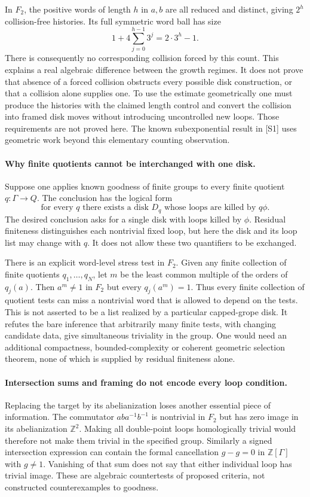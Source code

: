 \documentclass[11pt]{article}
\begin{document}
In $F_2$, the positive words of length $h$ in $a,b$ are all reduced
and distinct, giving $2^h$ collision-free histories. Its full symmetric
word ball has size
\[
                      1+4\sum_{j=0}^{h-1}3^j=2\cdot3^h-1.
\]
There is consequently no corresponding collision forced by this count.
This explains a real algebraic difference between the growth regimes.
It does not prove that absence of a forced collision obstructs every
possible disk construction, or that a collision alone supplies one.
To use the estimate geometrically one must produce the histories with
the claimed length control and convert the collision into framed disk
moves without introducing uncontrolled new loops. Those requirements
are not proved here. The known subexponential result in [S1] uses
geometric work beyond this elementary counting observation.

\paragraph{Why finite quotients cannot be interchanged with one disk.}
Suppose one applies known goodness of finite groups to every finite
quotient $q:\Gamma\to Q$. The conclusion has the logical form
\[
          \text{for every }q\text{ there exists a disk }D_q
          \text{ whose loops are killed by }q\phi.
\]
The desired conclusion asks for a single disk with loops killed by
$\phi$. Residual finiteness distinguishes each nontrivial fixed loop,
but here the disk and its loop list may change with $q$. It does not
allow these two quantifiers to be exchanged.

There is an explicit word-level stress test in $F_2$. Given any finite
collection of finite quotients $q_1,\ldots,q_N$, let $m$ be the least
common multiple of the orders of $q_j(a)$. Then $a^m\ne1$ in $F_2$
but every $q_j(a^m)=1$. Thus every finite collection of quotient tests
can miss a nontrivial word that is allowed to depend on the tests.
This is not asserted to be a list realized by a particular capped-grope
disk. It refutes the bare inference that arbitrarily many finite tests,
with changing candidate data, give simultaneous triviality in the group.
One would need an additional compactness, bounded-complexity or coherent
geometric selection theorem, none of which is supplied by residual
finiteness alone.

\paragraph{Intersection sums and framing do not encode every loop condition.}
Replacing the target by its abelianization loses another essential
piece of information. The commutator $aba^{-1}b^{-1}$ is nontrivial
in $F_2$ but has zero image in its abelianization $\mathbb Z^2$.
Making all double-point loops homologically trivial would therefore
not make them trivial in the specified group. Similarly a signed
intersection expression can contain the formal cancellation
$g-g=0$ in $\mathbb Z[\Gamma]$ with $g\ne1$. Vanishing of that
sum does not say that either individual loop has trivial image.
These are algebraic countertests of proposed criteria, not constructed
counterexamples to goodness.
\end{document}
